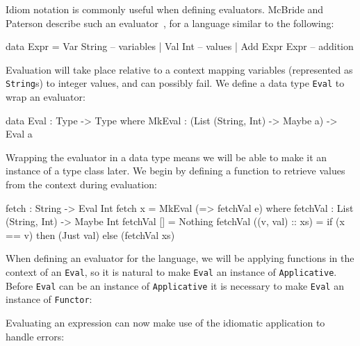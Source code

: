 Idiom notation is commonly useful when defining evaluators.
McBride and Paterson describe such an evaluator~\cite{idioms}, for a language similar to the following:

\begin{code}
data Expr = Var String      -- variables
          | Val Int         -- values
          | Add Expr Expr   -- addition
\end{code} 

\noindent
Evaluation will take place relative to a context mapping variables (represented as \texttt{String}s) to integer values, and can possibly fail.
We define a data type \texttt{Eval} to wrap an evaluator:

\begin{code}
data Eval : Type -> Type where
     MkEval : (List (String, Int) -> Maybe a) -> Eval a
\end{code} 

\noindent
Wrapping the evaluator in a data type means we will be able to make it an instance of a type class later. We begin by defining a function to retrieve values from the context during evaluation:

\begin{code}
fetch : String -> Eval Int
fetch x = MkEval (\e => fetchVal e) where
    fetchVal : List (String, Int) -> Maybe Int
    fetchVal [] = Nothing
    fetchVal ((v, val) :: xs) = if (x == v)
                                  then (Just val)
                                  else (fetchVal xs)
\end{code} 
  
\noindent
When defining an evaluator for the language, we will be applying functions in the context of an \texttt{Eval}, so it is natural to make \texttt{Eval} an instance of \texttt{Applicative}.
Before \texttt{Eval} can be an instance of \texttt{Applicative} it is necessary to make \texttt{Eval} an instance of \texttt{Functor}:


\noindent
Evaluating an expression can now make use of the idiomatic application to handle errors:

